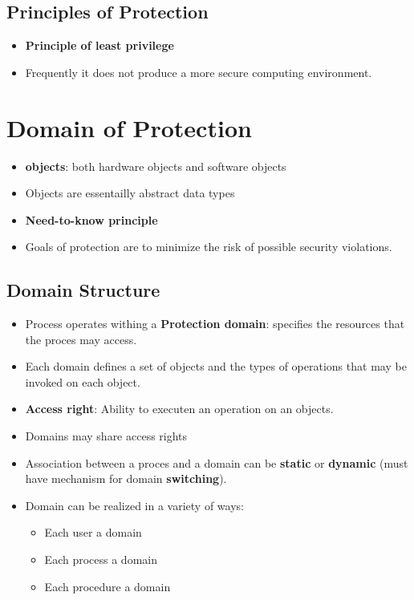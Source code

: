 \documentclass[10pt]{report}
\begin{document}
	\subsection{Principles of Protection}
		\begin{itemize}
			\item \textbf{Principle of least privilege}
			\item Frequently it does not produce a more secure computing environment.
		\end{itemize}

	\section{Domain of Protection}
		\begin{itemize}
			\item \textbf{objects}: both hardware objects and software objects
			\item Objects are essentailly abstract data types
			\item \textbf{Need-to-know principle}
			\item Goals of protection are to minimize the risk of possible security violations.
		\end{itemize}

		\subsection{Domain Structure}
			\begin{itemize}
				\item Process operates withing a \textbf{Protection domain}: specifies the resources that the proces may access.
				\item Each domain defines a set of objects and the types of operations that may be invoked on each object.
				\item \textbf{Access right}: Ability to executen an operation on an objects.
				\item Domains may share access rights
				\item Association between a proces and a domain can be \textbf{static} or \textbf{dynamic} (must have mechanism for domain \textbf{switching}).
				\item Domain can be realized in a variety of ways:
				\begin{itemize}
					\item Each user a domain
					\item Each process a domain
					\item Each procedure a domain
				\end{itemize}
			\end{itemize}
\end{document}
